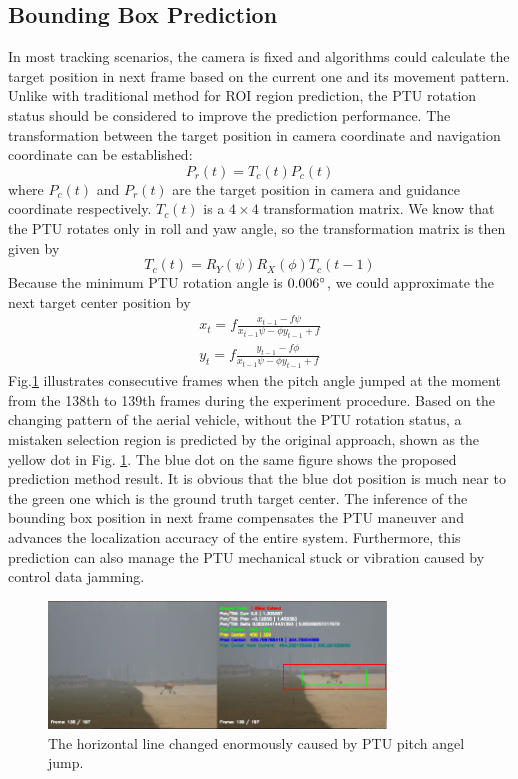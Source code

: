 \subsection{Bounding Box Prediction}
In most tracking scenarios, the camera is fixed and algorithms could calculate the target position in next frame based on the current one and its movement pattern. Unlike with traditional method for ROI region prediction, the PTU rotation status should be considered to improve the prediction performance. The transformation between the target position in camera coordinate and navigation coordinate can be established:
\begin{equation}
	P_r(t) = T_c(t) P_c(t)
\end{equation}
where $P_c(t)$ and $P_r(t)$ are the target position in camera and guidance coordinate respectively. $T_c(t)$ is a $4 \times 4$ transformation matrix. We know that the PTU rotates only in roll and yaw angle, so the transformation matrix is then given by 
\begin{equation}
	T_c(t) = R_Y(\psi)R_X(\phi)T_c(t-1)
\end{equation}
Because the minimum PTU rotation angle is $0.006 \degree$, we could approximate the next target center position by
\begin{align}
	\label{eq:prev_predict_curr}
	x_{t} = f\frac{x_{t-1} - f\psi }{x_{t-1}  \psi  - \phi y_{t-1} + f} \\
	y_{t} = f\frac{y_{t-1} -f\phi}{  x_{t-1} \psi - \phi y_{t-1} + f}
\end{align}
Fig.\ref{fig:chp04_17_predict_1} illustrates consecutive frames when the pitch angle jumped at the moment from the 138th to 139th frames during the experiment procedure. Based on the changing pattern of the aerial vehicle, without the PTU rotation status, a mistaken selection region is predicted by the original approach, shown as the yellow dot in Fig. \ref{fig:chp04_17_predict_1}. The blue dot on the same figure shows the proposed prediction method result. It is obvious that the blue dot position is much near to the green one which is the ground truth target center. The inference of the bounding box position in next frame compensates the PTU maneuver and advances the localization accuracy of the entire system. Furthermore, this prediction can also manage the PTU mechanical stuck or vibration caused by control data jamming.

\begin{figure}[!th]
	\centering
	\includegraphics[width=0.8\textwidth]{Figs/chp04_17_predict_1.pdf}
	\caption{The horizontal line changed enormously caused by PTU pitch angel jump. }
	\label{fig:chp04_17_predict_1}    
\end{figure}


